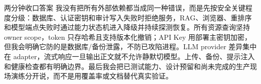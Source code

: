 \begin{qaBox}{两分钟收口答案}
我没有把所有外部依赖都当成同一种错误，而是先按安全关键程度分级：数据库、认证密钥和审计写入失败时拒绝服务，RAG、浏览器、重排序和模型端点失败时通过能力状态机进入降级并持续探测恢复。所有资源查询坚持 owner scope，token 只存哈希且支持版本化撤销；API Key 用部署主密钥加密，但我会明确它防的是数据库/备份泄露，不防已攻陷进程。LLM provider 差异集中在 adapter，流式响应一旦输出正文就不允许静默切模型。上传、备份、提示注入和健康检查都有明确边界。最后我会把已测试能力、设计预留和尚未完成的生产现场演练分开说，而不是用覆盖率或文档替代真实验证。
\end{qaBox}
